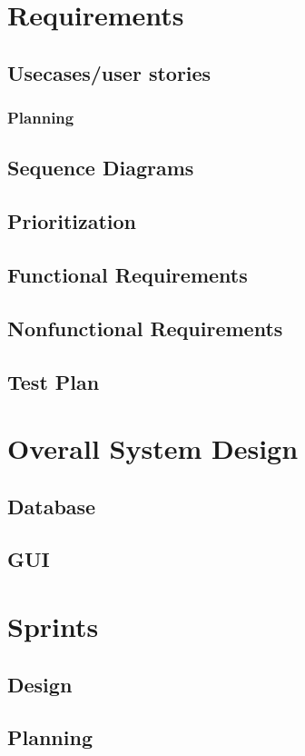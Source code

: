 \documentclass[10pt,a4paper,oneside]{report}
\begin{document}

\clearpage


\chapter{Requirements}
\section{Usecases/user stories}
\subsection{Planning}
\section{Sequence Diagrams}
\section{Prioritization}
\section{Functional Requirements}
\section{Nonfunctional Requirements}
\section{Test Plan}

\chapter{Overall System Design}
\section{Database}
\section{GUI}

\chapter{Sprints}
\section{Design}
\section{Planning}
\end{document}
